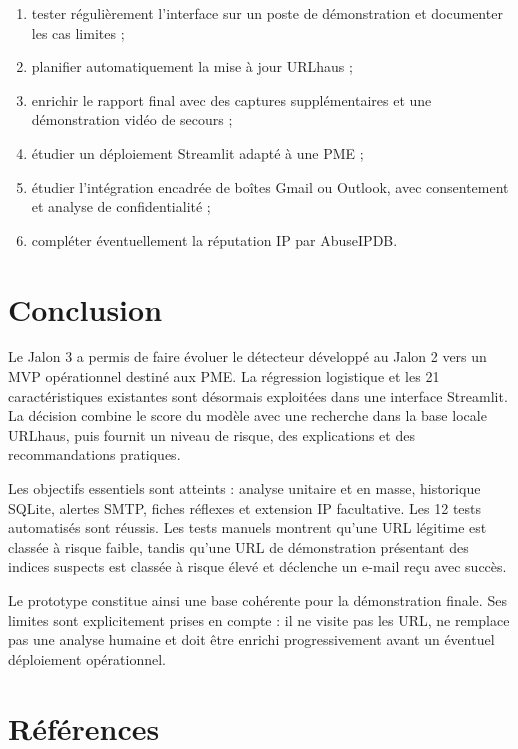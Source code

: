 \documentclass[11pt,a4paper]{report}
\begin{document}
\begin{enumerate}
  \item tester régulièrement l'interface sur un poste de démonstration et
        documenter les cas limites ;
  \item planifier automatiquement la mise à jour URLhaus ;
  \item enrichir le rapport final avec des captures supplémentaires et une
        démonstration vidéo de secours ;
  \item étudier un déploiement Streamlit adapté à une PME ;
  \item étudier l'intégration encadrée de boîtes Gmail ou Outlook, avec
        consentement et analyse de confidentialité ;
  \item compléter éventuellement la réputation IP par AbuseIPDB.
\end{enumerate}

\chapter{Conclusion}

Le Jalon 3 a permis de faire évoluer le détecteur développé au Jalon 2 vers
un MVP opérationnel destiné aux PME. La régression logistique et les 21
caractéristiques existantes sont désormais exploitées dans une interface
Streamlit. La décision combine le score du modèle avec une recherche dans la
base locale URLhaus, puis fournit un niveau de risque, des explications et des
recommandations pratiques.

Les objectifs essentiels sont atteints : analyse unitaire et en masse,
historique SQLite, alertes SMTP, fiches réflexes et extension IP facultative.
Les 12 tests automatisés sont réussis. Les tests manuels montrent qu'une URL
légitime est classée à risque faible, tandis qu'une URL de démonstration
présentant des indices suspects est classée à risque élevé et déclenche un
e-mail reçu avec succès.

Le prototype constitue ainsi une base cohérente pour la démonstration finale.
Ses limites sont explicitement prises en compte : il ne visite pas les URL,
ne remplace pas une analyse humaine et doit être enrichi progressivement
avant un éventuel déploiement opérationnel.

\chapter*{Références}
\end{document}
